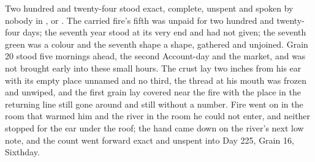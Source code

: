 Two hundred and twenty-four stood exact, complete, unspent and spoken by nobody in ,  or . The carried fire's fifth was unpaid for two hundred and twenty-four days; the seventh year stood at its very end and had not given; the seventh green was a colour and the seventh shape a shape, gathered and unjoined. Grain 20 stood five mornings ahead, the second Account-day and the market, and was not brought early into these small hours. The crust lay two inches from his ear with its empty place unnamed and no third, the thread at his mouth was frozen and unwiped, and the first grain lay covered near the fire with the place in the returning line still gone around and still without a number. Fire went on in the room that warmed him and the river in the room he could not enter, and neither stopped for the ear under the roof; the hand came down on the river's next low note, and the count went forward exact and unspent into Day 225, Grain 16, Sixthday.
